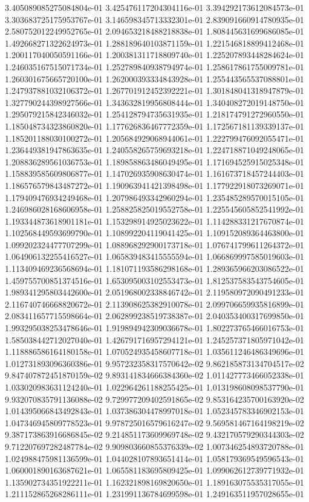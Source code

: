 3.405089085275084804e-01
3.425476117204304116e-01
3.394292173612084573e-01
3.303683725175953767e-01
3.146598345713332301e-01
2.839091660914780935e-01
2.580752012249952765e-01
2.094653218488218838e-01
1.808445631699686085e-01
1.492668271322624973e-01
1.288189640103871159e-01
1.221546818899412468e-01
1.200117040050591166e-01
1.200381311718809740e-01
1.225207893448284624e-01
1.246035167515071734e-01
1.252789840938794974e-01
1.258617861755009781e-01
1.260301675665720100e-01
1.262000393334843928e-01
1.255443565537088801e-01
1.247937881032106372e-01
1.267701912452392221e-01
1.301848041318947879e-01
1.327790244398927566e-01
1.343632819956808444e-01
1.340408272019148750e-01
1.295079215842346032e-01
1.254128794735631935e-01
1.218174791272960550e-01
1.185048734323860820e-01
1.177626836467772359e-01
1.172567181139339137e-01
1.185201188030100272e-01
1.205684929068944061e-01
1.222799476092055471e-01
1.236449381947863635e-01
1.240558265759693218e-01
1.224718871049248065e-01
1.208836289561036753e-01
1.189858863486049495e-01
1.171694525915025348e-01
1.158839585609806877e-01
1.147026935908630474e-01
1.161673718457244403e-01
1.186576579843487272e-01
1.190963941421398498e-01
1.177922918073269071e-01
1.179409476934249468e-01
1.207986493342960294e-01
1.235485289570015105e-01
1.246986028168606958e-01
1.258825825019552758e-01
1.225545605852541992e-01
1.193344873618901181e-01
1.153298914925023622e-01
1.114288331217670874e-01
1.102568449593699790e-01
1.108992204119041425e-01
1.109152089364463800e-01
1.099202324477707299e-01
1.088968292900173718e-01
1.076741799611264372e-01
1.064906132255416527e-01
1.065839483415555594e-01
1.066869997585019603e-01
1.113409469236568694e-01
1.181071193586298168e-01
1.289365966203086522e-01
1.459755700851374516e-01
1.653095003102553473e-01
1.812537583543754605e-01
1.989341295803442600e-01
2.051968002338846742e-01
2.119580972090491233e-01
2.116740746668820672e-01
2.113908625382910078e-01
2.099706659935816899e-01
2.083411657715598664e-01
2.062899238519738387e-01
2.040353400317699850e-01
1.993295038253478646e-01
1.919894942309036678e-01
1.802273765466016753e-01
1.585038442712027040e-01
1.426791716957294121e-01
1.245257371805971042e-01
1.118886586164180158e-01
1.070524935458607718e-01
1.035611246486349696e-01
1.012731893096360386e-01
9.957232358317570642e-02
9.862185873134704517e-02
9.847407872451870159e-02
9.893141834666384360e-02
1.011427773466052338e-01
1.033020983631124240e-01
1.022964261188255425e-01
1.013198608098537790e-01
9.932070835791136088e-02
9.729977209402591865e-02
9.853164235700163920e-02
1.014395066843492843e-01
1.037386304478997018e-01
1.052345783346902153e-01
1.047346945809778523e-01
9.978725016579616247e-02
9.569581467164198219e-02
9.387173863916686845e-02
9.214851173609969748e-02
9.432170579290344303e-02
9.712207697282487784e-02
9.909803660855376339e-02
1.007346254893720788e-01
1.024988475981136599e-01
1.044028107893651414e-01
1.058179369549596543e-01
1.060001890163687621e-01
1.065581183695809425e-01
1.099062612739771932e-01
1.135902734351922211e-01
1.162321898169820650e-01
1.189163075535317055e-01
1.211152865268286111e-01
1.231991136784699598e-01
1.249163511957028655e-01
